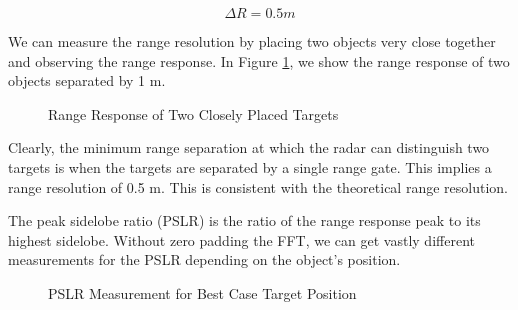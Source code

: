 \documentclass[conference]{IEEEtran}
\begin{document}
	\begin{equation}
		{\Delta}R = 0.5 m
	\end{equation}
	
	We can measure the range resolution by placing two objects very close together and observing the range response. In Figure \ref{fig::range_resolution}, we show the range response of two objects separated by 1 m. 
	 
	\begin{figure}[H]
	    	\centering
	    	\caption{Range Response of Two Closely Placed Targets}
	    	\label{fig::range_resolution}
	\end{figure}
		
	Clearly, the minimum range separation at which the radar can distinguish two targets is when the targets are separated by a single range gate. This implies a range resolution of 0.5 m. This is consistent with the theoretical range resolution.
	
	The peak sidelobe ratio (PSLR) is the ratio of the range response peak to its highest sidelobe. Without zero padding the FFT, we can get vastly different measurements for the PSLR depending on the object's position.
	
	\begin{figure}[H]
	    	\centering
	    	\caption{PSLR Measurement for Best Case Target Position}
	    	\label{fig::pslr_best_position}
	\end{figure}
	
\end{document}
